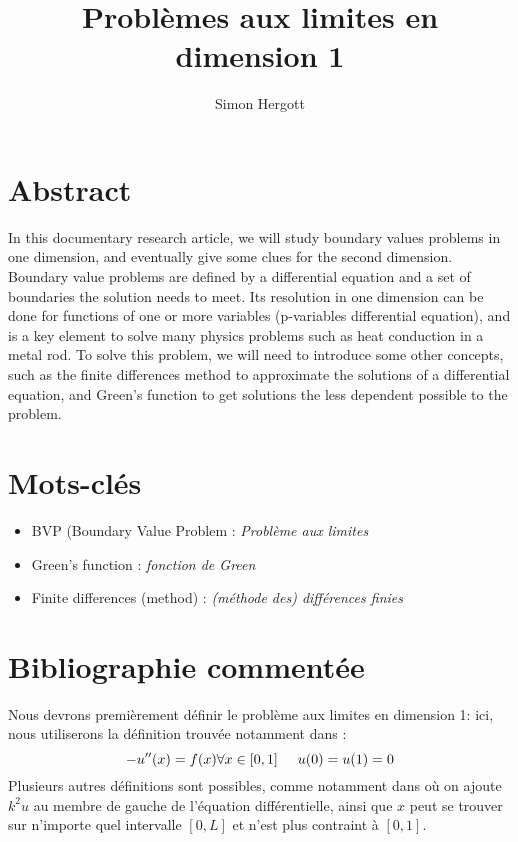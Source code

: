 \documentclass[10pt]{article}
\title{Problèmes aux limites en dimension 1} %
\author{Simon Hergott} %
\newcommand{\espace}{\hspace{5mm}}
\begin{document}
	\maketitle
	
\section{Abstract}

In this documentary research article, we will study boundary values problems in one dimension, and eventually give some clues for the second dimension. Boundary value problems are defined by a differential equation and a set of boundaries the solution needs to meet.  Its resolution in one dimension can be done for functions of one or more variables (p-variables differential equation), and is a key element to solve many physics problems such as heat conduction in a metal rod.
To solve this problem, we will need to introduce some other concepts, such as the finite differences method to approximate the solutions of a differential equation, and Green's function to get solutions the less dependent possible to the problem.

\section{Mots-clés}

\begin{itemize}
	\item BVP (Boundary Value Problem :  \emph{Problème aux limites}
	\item Green's function : \emph{fonction de Green}
	\item Finite differences (method) : \emph{(méthode des) différences finies}
\end{itemize}
	
\section{Bibliographie commentée}

\quad Nous devrons premièrement définir le problème aux limites en dimension 1: ici, nous utiliserons la définition trouvée notamment dans \cite{1}:
\begin{equation}
-u''(x) = f(x) \forall x \in [0,1] \espace u(0) = u(1)  =0
\end{equation}
Plusieurs autres définitions sont possibles, comme notamment dans \cite{2} où on ajoute $k^2 u$ au membre de gauche de l'équation différentielle, ainsi que $x$ peut se trouver sur n'importe quel intervalle $[0,L]$ et n'est plus contraint à $[0,1]$.
\end{document}
